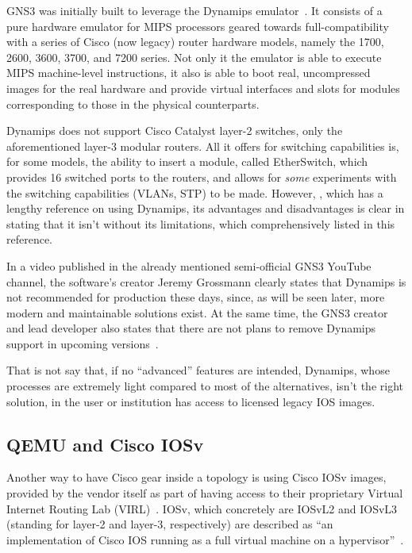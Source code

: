 GNS3 was initially built to leverage the Dynamips emulator~\cite{thebookofgns3}.
It consists of a pure hardware emulator for MIPS processors geared towards full-compatibility with a series of Cisco (now legacy) router hardware models, namely the 1700, 2600, 3600, 3700, and 7200 series. %
Not only it the emulator is able to execute MIPS machine-level instructions, it also is able to boot real, uncompressed images for the real hardware and provide virtual interfaces and slots for modules corresponding to those in the physical counterparts.

Dynamips does not support Cisco Catalyst layer-2 switches, only the aforementioned layer-3 modular routers.
All it offers for switching capabilities is, for some models, the ability to insert a module, called EtherSwitch, which provides 16 switched ports to the routers, and allows for \emph{some} experiments with the switching capabilities (VLANs, STP) to be made.
However, \cite{thebookofgns3}, which has a lengthy reference on using Dynamips, its advantages and disadvantages is clear in stating that it isn't without its limitations, which comprehensively listed in this reference.

In a video published in the already mentioned semi-official GNS3 YouTube channel, the software's creator Jeremy Grossmann clearly states that Dynamips is not recommended for production these days, since, as will be seen later, more modern and maintainable solutions exist. At the same time, the GNS3 creator and lead developer also states that there are not plans to remove Dynamips support in upcoming versions~\cite{ytdynamipsvpcs}.

That is not say that, if no ``advanced'' features are intended, Dynamips, whose processes are extremely light compared to most of the alternatives, isn't the right solution, in the user or institution has access to licensed legacy IOS images. %

\subsection{QEMU and Cisco IOSv}
\label{subsec:gns3ciscoiosv}

Another way to have Cisco gear inside a topology is using Cisco IOSv images, provided by the vendor itself as part of having access to their proprietary Virtual Internet Routing Lab (VIRL)~\cite{ciscovirl}.
IOSv, which concretely are IOSvL2 and IOSvL3 (standing for layer-2 and layer-3, respectively) are described as ``an implementation of Cisco IOS running as a full virtual machine on a hypervisor''~\cite{ciscoiosvinfo}.

